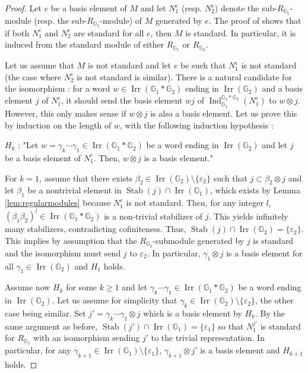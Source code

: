 \documentclass[a4paper, 11pt]{amsart}
\theoremstyle{plain}
\theoremstyle{definition}
\theoremstyle{remark}
\DeclareMathOperator{\Ind}{Ind}
\DeclareMathOperator{\Irr}{Irr}
\DeclareMathOperator{\Stab}{Stab}
\newcommand{\G}{\mathbb{G}}
\begin{document}
\begin{proof}
Let $e$ be a basis element of $M$ and let $N_{1}^{e}$ (resp. $N_{2}^{e}$) denote the sub-$R_{\G_{1}}$-module (resp. the sub-$R_{\G_{2}}$-module) of $M$ generated by $e$. The proof of \cite[Thm 1.25]{arano2015torsion} shows that if both $N_{1}^{e}$ and $N_{2}^{e}$ are standard for all $e$, then $M$ is standard. In particular, it is induced from the standard module of either $R_{\G_{1}}$ or $R_{\G_{2}}$. 

Let us assume that $M$ is not standard and let $e$ be such that $N_{1}^{e}$ is not standard (the case where $N_{2}^{e}$ is not standard is similar). There is a natural candidate for the isomorphism : for a word $w\in \Irr(\G_{1}\ast\G_{2})$ ending in $\Irr(\G_{2})$ and a basis element $j$ of $N_{1}^{e}$, it should send the basis element $wj$ of $\Ind_{\G_{1}}^{\G_{1}\ast\G_{2}}(N_{1}^{e})$ to $w\otimes j$. However, this only makes sense if $w\otimes j$ is also a basis element. Let us prove this by induction on the length of $w$, with the following induction hypothesis :
\begin{center}
$H_{k}$ : "Let $w = \gamma_{k}\cdots\gamma_{1}\in \Irr(\G_{1}\ast\G_{2})$ be a word ending in $\Irr(\G_{2})$ and let $j$ be a basis element of $N_{1}^{e}$. Then, $w\otimes j$ is a basis element."
\end{center}

For $k=1$, assume that there exists $\beta_{2}\in \Irr(\G_{2})\setminus\{\varepsilon_{2}\}$ such that $j\subset \beta_{2}\otimes j$ and let $\beta_{1}$ be a nontrivial element in $\Stab(j)\cap\Irr(\G_{1})$, which exists by Lemma \ref{lem:regularmodules} because $N_{1}^{e}$ is not standard. Then, for any integer $l$, $(\beta_{1}\beta_{2})^{l}\in \Irr(\G_{1}\ast\G_{2})$ is a non-trivial stabilizer of $j$. This yields infinitely many stabilizers, contradicting cofiniteness. Thus, $\Stab(j)\cap\Irr(\G_{2}) = \{\varepsilon_{2}\}$. This implies by assumption that the $R_{\G_{2}}$-submodule generated by $j$ is standard and the isomorphism must send $j$ to $\varepsilon_{2}$. In particular, $\gamma_{1}\otimes j$ is a basis element for all $\gamma_{1}\in \Irr(\G_{2})$ and $H_{1}$ holds.

Assume now $H_{k}$ for some $k\geqslant 1$ and let $\gamma_{k}\cdots\gamma_{1}\in \Irr(\G_{1}\ast\G_{2})$ be a word ending in $\Irr(\G_{2})$. Let us assume for simplicity that $\gamma_{k}\in \Irr(\G_{2})\setminus\{\varepsilon_{2}\}$, the other case being similar. Set $j' = \gamma_{k}\cdots\gamma_{1}\otimes j$ which is a basis element by $H_{k}$. By the same argument as before, $\Stab(j')\cap\Irr(\G_{1}) = \{\varepsilon_{1}\}$ so that $N_{1}^{j'}$ is standard for $R_{\G_{1}}$ with an isomorphism sending $j'$ to the trivial representation. In particular, for any $\gamma_{k+1}\in \Irr(\G_{1})\setminus\{\varepsilon_{1}\}$, $\gamma_{k+1}\otimes j'$ is a basis element and $H_{k+1}$ holds.


\end{proof}
\end{document}
